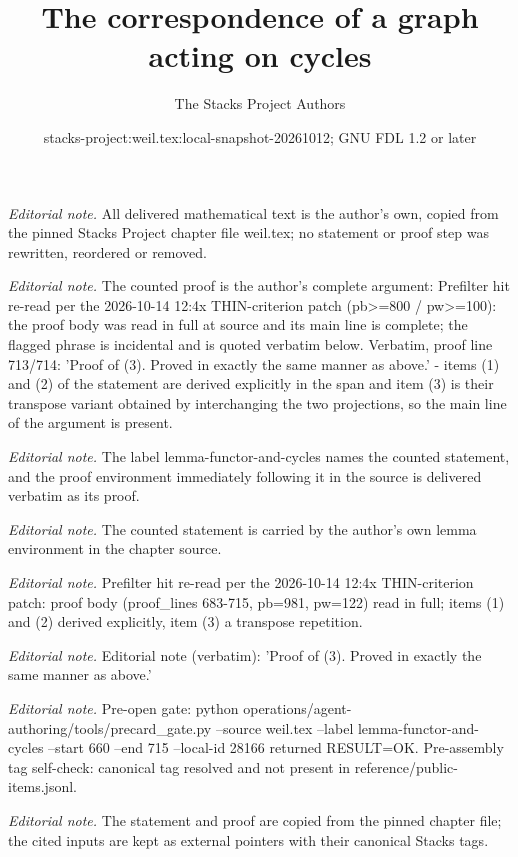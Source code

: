 \documentclass[10pt,a4paper]{amsart}
\title{The correspondence of a graph acting on cycles}
\author{The Stacks Project Authors}
\date{stacks-project:weil.tex:local-snapshot-20261012; GNU FDL 1.2 or later}
\theoremstyle{plain}
\theoremstyle{definition}
\theoremstyle{remark}
\numberwithin{equation}{subsection}
\begin{document}
\maketitle
\noindent\textit{Editorial note.} All delivered mathematical text is the author's own, copied from the pinned Stacks Project chapter file weil.tex; no statement or proof step was rewritten, reordered or removed.\par\medskip
\noindent\textit{Editorial note.} The counted proof is the author's complete argument: Prefilter hit re-read per the 2026-10-14 12:4x THIN-criterion patch (pb>=800 / pw>=100): the proof body was read in full at source and its main line is complete; the flagged phrase is incidental and is quoted verbatim below. Verbatim, proof line 713/714: 'Proof of (3). Proved in exactly the same manner as above.'  -  items (1) and (2) of the statement are derived explicitly in the span and item (3) is their transpose variant obtained by interchanging the two projections, so the main line of the argument is present.\par\medskip
\noindent\textit{Editorial note.} The label lemma-functor-and-cycles names the counted statement, and the proof environment immediately following it in the source is delivered verbatim as its proof.\par\medskip
\noindent\textit{Editorial note.} The counted statement is carried by the author's own lemma environment in the chapter source.\par\medskip
\noindent\textit{Editorial note.} Prefilter hit re-read per the 2026-10-14 12:4x THIN-criterion patch: proof body (proof\_lines 683-715, pb=981, pw=122) read in full; items (1) and (2) derived explicitly, item (3) a transpose repetition.\par\medskip
\noindent\textit{Editorial note.} Editorial note (verbatim): 'Proof of (3). Proved in exactly the same manner as above.'\par\medskip
\noindent\textit{Editorial note.} Pre-open gate: python operations/agent-authoring/tools/precard\_gate.py --source weil.tex --label lemma-functor-and-cycles --start 660 --end 715 --local-id 28166 returned RESULT=OK. Pre-assembly tag self-check: canonical tag resolved and not present in reference/public-items.jsonl.\par\medskip
\noindent\textit{Editorial note.} The statement and proof are copied from the pinned chapter file; the cited inputs are kept as external pointers with their canonical Stacks tags.\par\medskip
\end{document}
